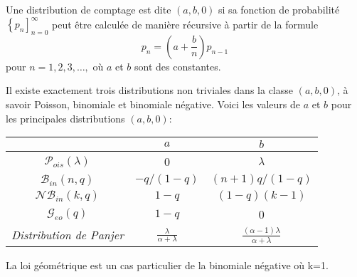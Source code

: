 \begin{f}
	
	Une distribution de comptage est dite  $(a, b, 0)$ si sa fonction de probabilité $\left\{p_{n}\right]_{n=0}^{\infty}$ peut être calculée de manière récursive à partir de la formule
	$$
	p_{n}=\left(a+\frac{b}{n}\right) p_{n-1}
	$$
	pour $n=1,2,3, \ldots,$ où $a$ et $b$ sont des constantes.
	
	Il existe exactement trois distributions non triviales dans la classe $(a, b, 0)$, à savoir Poisson, binomiale et binomiale négative. Voici les valeurs de $a$ et $b$ pour les principales distributions $(a, b, 0)$:
	\begin{center}
		\begin{tabular}{ccc} 
			& $a$ & $b$ \\
			\hline$\mathcal{P}_{ois}(\lambda)$ & 0 & $\lambda$ \\
			$\mathcal{B}_{in}(n, q)$ & $-q /(1-q)$ & $(n+1) q /(1-q)$ \\
			$\mathcal{N}\mathcal{B}_{in}(k, q)$ & $1-q$ & $(1-q)(k-1)$ \\
			$\mathcal{G}_{eo}( q)$ & $1-q$ & 0 \\
			\textit{    Distribution de Panjer} & $\frac{\lambda}{\alpha+\lambda}$ &    $\frac {(\alpha -1)\lambda }{\alpha +\lambda }$ \\
			\hline 
		\end{tabular}
		
	\end{center}
	
	{\footnotesize\color{OrangeProfondIRA} La loi géométrique est un cas particulier de la binomiale négative où k=1.}
\end{f}

